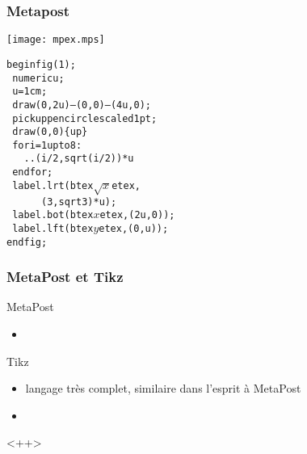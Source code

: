 \documentclass[nodefaultblocks]{beamer}
\begin{document}
\begin{frame}\frametitle{Metapost}
  \begin{minipage}{0.3\linewidth}
  \texttt{[image: mpex.mps]}
  \end{minipage}
  \hfill
  \begin{minipage}{0.6\linewidth}
    \small
    \begin{alltt}
beginfig(1);\\
\hspace*{0pt}~ numeric u;\\
\hspace*{0pt}~ u = 1cm;\\
\hspace*{0pt}~ draw (0,2u)---(0,0)---(4u,0);\\
\hspace*{0pt}~ pickup pencircle scaled 1pt;\\
\hspace*{0pt}~ draw (0,0)\{up\}\\
\hspace*{0pt}~ for i=1 upto 8: \\
\hspace*{0pt}~~~  ..(i/2,sqrt(i/2))*u  \\
\hspace*{0pt}~ endfor;\\
\hspace*{0pt}~ label.lrt(btex $\sqrt x$ etex, 
\hspace*{0pt}~ ~ ~ ~ ~ ~ (3,sqrt 3)*u);\\
\hspace*{0pt}~ label.bot(btex $x$ etex, (2u,0));\\
\hspace*{0pt}~ label.lft(btex $y$ etex, (0,u));\\
endfig;\\
    \end{alltt}
  \end{minipage}
\end{frame}

\begin{frame}\frametitle{MetaPost et Tikz}
  \begin{block}{MetaPost}
    \begin{itemize}
      \item 
    \end{itemize}
  \end{block}
  \begin{block}{Tikz}
    \begin{itemize}
      \item langage très complet, similaire dans l'esprit à MetaPost
      \item  
    \end{itemize}
  \end{block}
\end{frame}<++>
\end{document}
